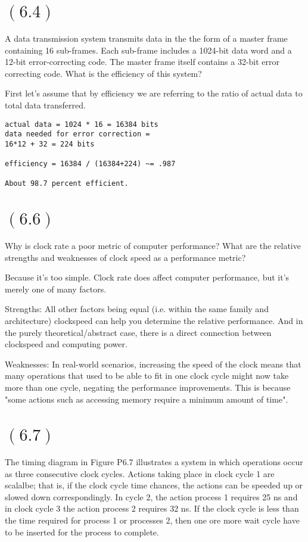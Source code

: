 \documentclass[letterpaper,12pt,titlepage]{article}
\begin{document}
\section*{$(6.4)$} A data transmission system transmits data in the the form of a master frame containing 16 sub-frames. Each sub-frame includes a 1024-bit data word and a 12-bit error-correcting code. The master frame itself contains a 32-bit error correcting code. What is the efficiency of this system?

\begin{mdframed}[style=MyFrame]

First let's assume that by efficiency we are referring to the ratio of actual data to total data transferred.
\begin{verbatim}
actual data = 1024 * 16 = 16384 bits
data needed for error correction =
16*12 + 32 = 224 bits

efficiency = 16384 / (16384+224) ~= .987

About 98.7 percent efficient.

\end{verbatim}
\end{mdframed}

\section*{$(6.6)$} Why is clock rate a poor metric of computer performance? What are the relative strengths and weaknesses of clock speed as a performance metric?

\begin{mdframed}[style=MyFrame]
    Because it's too simple. Clock rate does affect computer performance, but it's merely one of many factors.

    Strengths: All other factors being equal (i.e. within the same family and architecture) clockspeed can help you determine the relative performance. And in the purely theoretical/abstract case, there is a direct connection between clockspeed and computing power.

    Weaknesses: In real-world scenarios, increasing the speed of the clock means that many operations that used to be able to fit in one clock cycle might now take more than one cycle, negating the performance improvements. This is because "some actions such as accessing memory require a minimum amount of time".
    \cite{Clements}
\end{mdframed}
\newpage
\section*{$(6.7)$} The timing diagram in Figure P6.7 illustrates a system in which operations occur as three consecutive clock cycles. Actions taking place in clock cycle 1 are scalalbe; that is, if the clock cycle time chances, the actions can be speeded up or slowed down correspondingly. In cycle 2, the action process 1 requires 25 ns and in clock cycle 3 the action process 2 requires 32 ns. If the clock cycle is less than the time required for process 1 or processes 2, then one ore more wait cycle have to be inserted for the process to complete.
\end{document}
